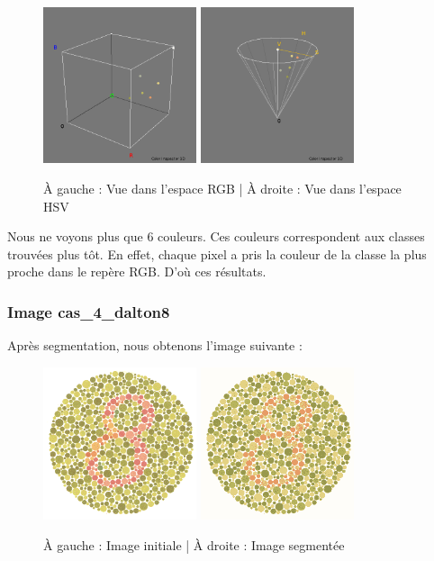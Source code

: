 \documentclass[a4paper]{article}
\begin{document}
\begin{figure}[H]
\begin{center}
  \includegraphics[width=170px]{../resultats/cas_4_dalton6_rgb.png}
\includegraphics[width=170px]{../resultats/cas_4_dalton6_hsv.png}
\end{center}
\caption{À gauche : Vue dans l'espace RGB | À droite : Vue dans l'espace HSV}
\end{figure}

Nous ne voyons plus que 6 couleurs. Ces couleurs correspondent aux classes trouvées plus tôt. En effet, chaque pixel a pris la couleur de la classe la plus proche dans le repère RGB. D'où ces résultats.

\clearpage
\subsubsection{Image cas\_4\_dalton8}

Après segmentation, nous obtenons l'image suivante :

\begin{figure}[H]
\begin{center}
\includegraphics[width=170px]{../base/cas_4_dalton8.png}
\includegraphics[width=170px]{../resultats/cas_4_dalton8.png}
\end{center}
\caption{À gauche : Image initiale | À droite : Image segmentée}
\end{figure}
\end{document}
